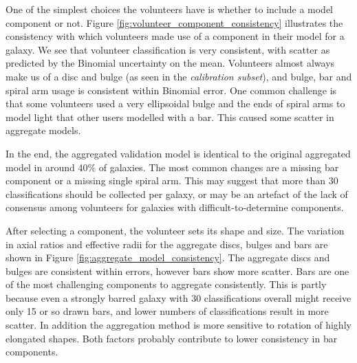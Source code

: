 \documentclass[trackchanges]{aastex63}
\begin{document}
One of the simplest choices the volunteers have is whether to include a model component or not. Figure \ref{fig:volunteer_component_consistency} illustrates the consistency with which volunteers made use of a component in their model for a galaxy. We see that volunteer classification is very consistent, with scatter as predicted by the Binomial uncertainty on the mean. Volunteers almost always make us of a disc and bulge (as seen in the \textit{calibration subset}), and bulge, bar and spiral arm usage is consistent within Binomial error. One common challenge is that some volunteers used a very ellipsoidal bulge and the ends of spiral arms to model light that other users modelled with a bar. This caused some scatter in aggregate models.

In the end, the aggregated validation model is identical to the original aggregated model in around 40\% of galaxies. The most common changes are a missing bar component or a missing single spiral arm. This may suggest that more than 30 classifications should be collected per galaxy, or may be an artefact of the lack of consensus among volunteers for galaxies with difficult-to-determine components.

\begin{figure*}
  \caption{Comparison of frequency of use of component in volunteer models between the original and validation sets of classifications. Errors shown on the disc, bulge and bar arise from Binomial error estimation. We see that classifications are generally consistent within errors, validating our assumption of volunteer independence.}
  \label{fig:volunteer_component_consistency}
\end{figure*}

After selecting a component, the volunteer sets its shape and size. The variation in axial ratios and effective radii for the aggregate discs, bulges and bars are shown in Figure \ref{fig:aggregate_model_consistency}. The aggregate discs and bulges are consistent within errors, however bars show more scatter. Bars are one of the most challenging components to aggregate consistently. This is partly because even a strongly barred galaxy with 30 classifications overall might receive only 15 or so drawn bars, and lower numbers of classifications result in more scatter. In addition the aggregation method is more sensitive to rotation of highly elongated shapes. Both factors probably contribute to lower consistency in bar components.

\begin{figure*}
  \caption{Comparison of component shape in aggregate models between the original and validation sets. Errors are obtained through the sample variance of clustered components, as detailed in Section \ref{sec:error_estimation}. We see close agreement between aggregate components from the two sets, suggesting that the clustering method is robust to the scatter in classifications.}
  \label{fig:aggregate_model_consistency}
\end{figure*}
\end{document}
